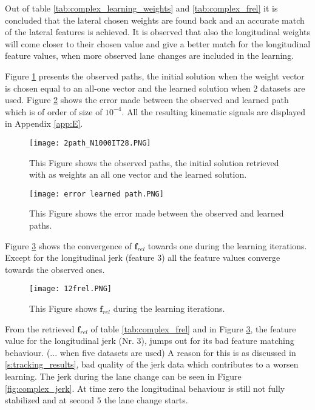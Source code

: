 Out of table \ref{tab:complex_learning_weights} and \ref{tab:complex_frel} it is concluded that the lateral chosen weights are found back and an accurate match of the lateral features is achieved. It is observed that also the longitudinal weights will come closer to their chosen value and give a better match for the longitudinal feature values, when more observed lane changes are included in the learning.

Figure \ref{fig:complex_path} presents the observed paths, the initial solution when the weight vector is chosen equal to an all-one vector and the learned solution when $2$ datasets are used. Figure \ref{fig:complex_path_error} shows the error made between the observed and learned path which is of order of size of $10^{-4}$. All the resulting kinematic signals are displayed in Appendix \ref{app:E}.

\begin{figure}[h!]
	\centering
	\texttt{[image: 2path\_N1000IT28.PNG]}
	\caption{This Figure shows the observed paths, the initial solution retrieved with as weights an all one vector and the learned solution.}	
	\label{fig:complex_path}
\end{figure}

\begin{figure}[h!]
	\centering
	\texttt{[image: error learned path.PNG]}
	\caption{This Figure shows the error made between the observed and learned paths.}	
	\label{fig:complex_path_error}
\end{figure}

Figure \ref{fig:complex_convergence} shows the convergence of $\bm{f}_{rel}$ towards one during the learning iterations. Except for the longitudinal jerk (feature $3$) all the feature values converge towards the observed ones.

\begin{figure}[h!]
	\centering
	\texttt{[image: 12frel.PNG]}
	\caption{This Figure shows $\bm{f}_{rel}$ during the learning iterations.}	
	\label{fig:complex_convergence}
\end{figure}

From the retrieved $\bm{f}_{rel}$ of table \ref{tab:complex_frel} and in Figure \ref{fig:complex_convergence}, the feature value for the longitudinal jerk (Nr. $3$), jumps out for its bad feature matching behaviour. ($...$ when five datasets are used) A reason for this is as discussed in \ref{s:tracking_results}, bad quality of the jerk data which contributes to a worsen learning. The jerk during the lane change can be seen in Figure \ref{fig:complex_jerk}. At time zero the longitudinal behaviour is still not fully stabilized and at second $5$ the lane change starts.

